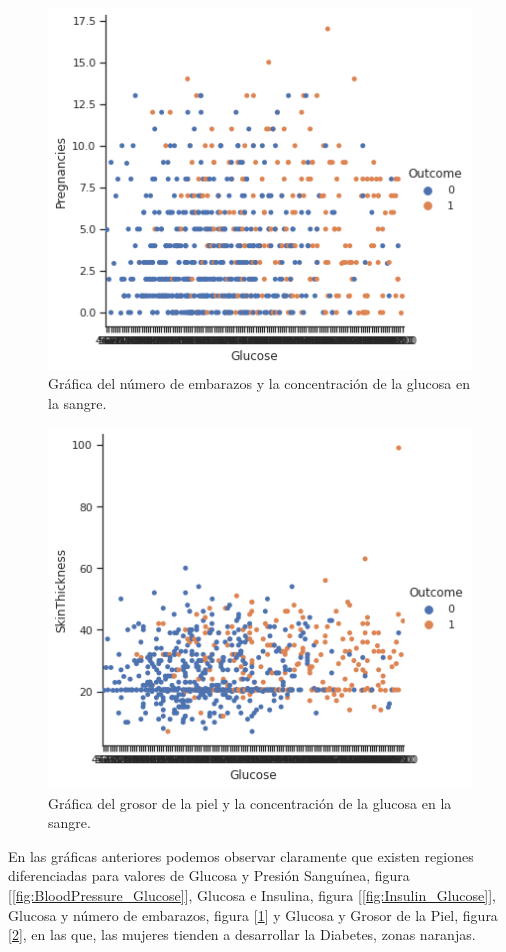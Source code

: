 \documentclass{article}
\begin{document}
\begin{figure}[H]
	\centering
	\includegraphics[width=0.65\linewidth]{Pregnancies_Glucose.png}
	\caption{Gráfica del número de embarazos y la concentración de la glucosa en la sangre.}%
	\label{fig:Pregnancies_Glucose}
\end{figure}

\begin{figure}[H]
	\centering
	\includegraphics[width=0.65\linewidth]{SkinThickness_Glucose.png}
	\caption{Gráfica del grosor de la piel y la concentración de la glucosa en la sangre.}%
	\label{fig:SkinThickness_Glucose}
\end{figure}

En las gráficas anteriores podemos observar claramente que existen regiones diferenciadas para valores de Glucosa y Presión Sanguínea, figura [\ref{fig:BloodPressure_Glucose}], Glucosa e Insulina, figura [\ref{fig:Insulin_Glucose}], Glucosa y número de embarazos, figura [\ref{fig:Pregnancies_Glucose}] y Glucosa y Grosor de la Piel, figura [\ref{fig:SkinThickness_Glucose}], en las que, las mujeres tienden a desarrollar la Diabetes, zonas naranjas.




\onecolumn{
  
  
}
\end{document}
